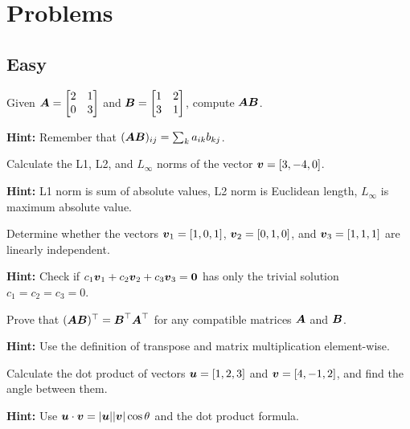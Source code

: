 
\section*{Problems}

\subsection*{Easy}

\begin{problem}
Given $\boldsymbol{A} = \begin{bmatrix} 2 & 1 \\ 0 & 3 \end{bmatrix}$ and $\boldsymbol{B} = \begin{bmatrix} 1 & 2 \\ 3 & 1 \end{bmatrix}$, compute $\boldsymbol{A}\boldsymbol{B}$.

\textbf{Hint:} Remember that $(\boldsymbol{A}\boldsymbol{B})_{ij} = \sum_k a_{ik}b_{kj}$.
\end{problem}

\begin{problem}
Calculate the L1, L2, and $L_\infty$ norms of the vector $\boldsymbol{v} = [3, -4, 0]$.

\textbf{Hint:} L1 norm is sum of absolute values, L2 norm is Euclidean length, $L_\infty$ is maximum absolute value.
\end{problem}

\begin{problem}
Determine whether the vectors $\boldsymbol{v}_1 = [1, 0, 1]$, $\boldsymbol{v}_2 = [0, 1, 0]$, and $\boldsymbol{v}_3 = [1, 1, 1]$ are linearly independent.

\textbf{Hint:} Check if $c_1\boldsymbol{v}_1 + c_2\boldsymbol{v}_2 + c_3\boldsymbol{v}_3 = \boldsymbol{0}$ has only the trivial solution $c_1 = c_2 = c_3 = 0$.
\end{problem}

\begin{problem}
Prove that $(\boldsymbol{A}\boldsymbol{B})^\top = \boldsymbol{B}^\top\boldsymbol{A}^\top$ for any compatible matrices $\boldsymbol{A}$ and $\boldsymbol{B}$.

\textbf{Hint:} Use the definition of transpose and matrix multiplication element-wise.
\end{problem}

\begin{problem}
Calculate the dot product of vectors $\boldsymbol{u} = [1, 2, 3]$ and $\boldsymbol{v} = [4, -1, 2]$, and find the angle between them.

\textbf{Hint:} Use $\boldsymbol{u} \cdot \boldsymbol{v} = |\boldsymbol{u}||\boldsymbol{v}|\cos\theta$ and the dot product formula.
\end{problem}

